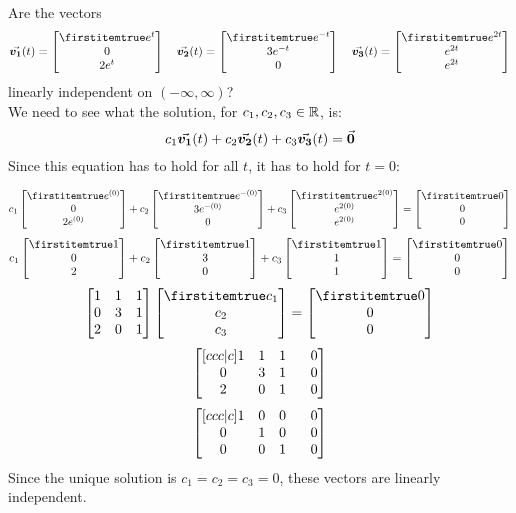 \documentclass{beamer}
\begin{document}
\begin{frame}
\begin{example}
Are the vectors
\begin{equation*}
\vect{v_1}(t)=\bvector{e^t,0,2e^t} \quad
\vect{v_2}(t)=\bvector{e^{-t},3e^{-t},0} \quad
\vect{v_3}(t)=\bvector{e^{2t},e^{2t},e^{2t}}
\end{equation*}
linearly independent on $(-\infty,\infty)$?\\
We need to see what the solution, for $c_1,c_2,c_3\in\mathbb{R}$, is:
\begin{equation*}
c_1{\vec{\boldsymbol{v_1}}}(t)+c_2{\vec{\boldsymbol{v_2}}}(t)+c_3{\vec{\boldsymbol{v_3}}}(t)={\vec{\boldsymbol{0}}}
\end{equation*}
Since this equation has to hold for all $t$, it has to hold for $t=0$:
\begin{overprint}
\begin{equation*}
c_1\bvector{e^{(0)},0,2e^{(0)}}+c_2\bvector{e^{-(0)},3e^{-(0)},0}+c_3\bvector{e^{2(0)},e^{2(0)},e^{2(0)}}=\bvector{0,0,0}
\end{equation*}
\begin{equation*}
c_1\bvector{1,0,2}+c_2\bvector{1,3,0}+c_3\bvector{1,1,1}=\bvector{0,0,0}
\end{equation*}
\begin{equation*}
\begin{bmatrix}
1 & 1 & 1 \\
0 & 3 & 1 \\
2 & 0 & 1 \\
\end{bmatrix}
\bvector{c_1, c_2, c_3}=\bvector{0,0,0}
\end{equation*}
\begin{equation*}
\begin{bmatrix}[ccc|c]
1 & 1 & 1 & \+0 \\
0 & 3 & 1 & \+0 \\
2 & 0 & 1 & \+0 \\
\end{bmatrix}
\end{equation*}
\begin{equation*}
\begin{bmatrix}[ccc|c]
1 & 0 & 0 & \+0 \\
0 & 1 & 0 & \+0 \\
0 & 0 & 1 & \+0 \\
\end{bmatrix}
\end{equation*}
\vspace{0.25cm}
Since the unique solution is $c_1=c_2=c_3=0$, these vectors are linearly independent.
\end{overprint}
\end{example}
\end{frame}
\end{document}
